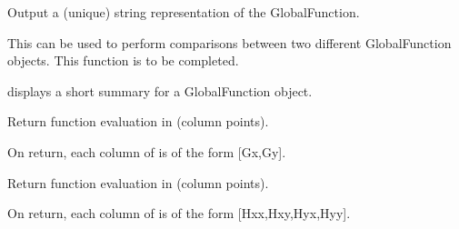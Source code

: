 \documentclass[a4paper,11pt,english]{sphinxmanual}
\begin{document}
\begin{fulllineitems}
\begin{itemize}
\end{itemize}

\begin{fulllineitems}
\label{\detokenize{python/cmdref_GlobalFunction:getfem.GlobalFunction.char}}
Output a (unique) string representation of the GlobalFunction.

This can be used to perform comparisons between two
different GlobalFunction objects.
This function is to be completed.

\end{fulllineitems}


\begin{fulllineitems}
\label{\detokenize{python/cmdref_GlobalFunction:getfem.GlobalFunction.display}}
displays a short summary for a GlobalFunction object.

\end{fulllineitems}


\begin{fulllineitems}
\label{\detokenize{python/cmdref_GlobalFunction:getfem.GlobalFunction.grad}}
Return  function evaluation in  (column points).

On return, each column of  is of the
form {[}Gx,Gy{]}.

\end{fulllineitems}


\begin{fulllineitems}
\label{\detokenize{python/cmdref_GlobalFunction:getfem.GlobalFunction.hess}}
Return  function evaluation in  (column points).

On return, each column of  is of the
form {[}Hxx,Hxy,Hyx,Hyy{]}.


\end{fulllineitems}
\end{fulllineitems}
\end{document}
